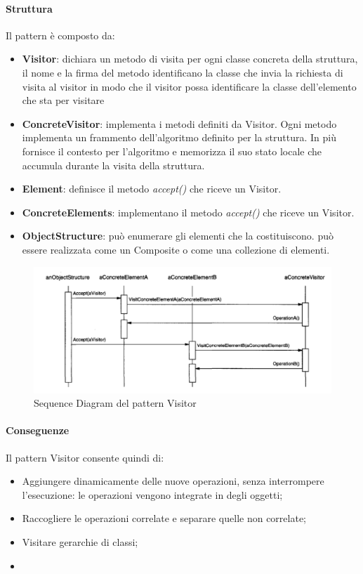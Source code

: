 \newpage

\paragraph{Struttura} Il pattern è composto da:
\begin{itemize}
    \item \textbf{Visitor}: dichiara un metodo di visita per ogni classe concreta della struttura, il nome e la firma del metodo identificano la classe che invia la richiesta di visita al visitor in modo che il visitor possa identificare la classe dell’elemento che sta per visitare
    \item \textbf{ConcreteVisitor}: implementa i metodi definiti da Visitor. Ogni metodo implementa un frammento dell’algoritmo definito per la struttura. In più fornisce il contesto per l’algoritmo e memorizza il suo stato locale che accumula durante la visita della struttura.
    \item \textbf{Element}: definisce il metodo \textit{accept()} che riceve un Visitor.
    \item \textbf{ConcreteElements}: implementano il metodo \textit{accept()} che riceve un Visitor.
    \item \textbf{ObjectStructure}: può enumerare gli elementi che la costituiscono. può essere realizzata come un Composite o come una collezione di elementi.
\end{itemize}

\begin{figure}[H]
    \centering
    \includegraphics[width=1\linewidth]{assets/pattern/visitor/visitor-sequence.png}
    \caption{Sequence Diagram del pattern Visitor}
\end{figure}

\paragraph{Conseguenze} Il pattern Visitor consente quindi di:
\begin{itemize}
    \item Aggiungere dinamicamente delle nuove operazioni, senza interrompere l'esecuzione: le operazioni vengono integrate in degli oggetti;
    \item Raccogliere le operazioni correlate e separare quelle non correlate;
    \item Visitare gerarchie di classi;
    \item 
\end{itemize}

